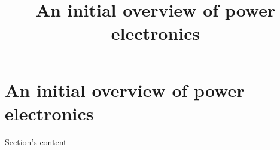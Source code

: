 
\section{An initial overview of power electronics}
\title[Initial overview]{An initial overview of power electronics}  

\begin{frame}[plain]
    \titlepage
\end{frame}

\begin{frame}{Section's content}
\end{frame}


